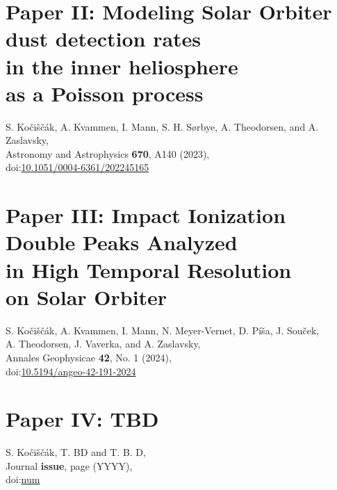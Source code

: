 \documentclass[11pt,twoside,openright]{book}
\begin{document}
\chapter{Paper II: Modeling Solar Orbiter \\ dust detection rates \\ in the inner heliosphere \\ as a Poisson process}
S. Ko{\v{c}}i{\v{s}}{\v{c}}{\'a}k, A. Kvammen, I. Mann, S. H. S{\o}rbye, A. Theodorsen, and A. Zaslavsky,\\
Astronomy and Astrophysics {\bf 670}, A140 (2023),\\
doi:\href{https://doi.org/10.1051/0004-6361/202245165}{10.1051/0004-6361/202245165}
\newpage\null\newpage



\chapter{Paper III: Impact Ionization \\ Double Peaks Analyzed \\ in High Temporal Resolution \\ on Solar Orbiter}
S. Ko{\v{c}}i{\v{s}}{\v{c}}{\'a}k, A. Kvammen, I. Mann, N. Meyer-Vernet, D. P{\'i}{\v{s}}a, J. Sou{\v{c}}ek, \\ A. Theodorsen, J. Vaverka, and A. Zaslavsky,\\
Annales Geophysicae {\bf 42}, No. 1 (2024),\\
doi:\href{https://doi.org/10.5194/angeo-42-191-2024}{10.5194/angeo-42-191-2024}
\newpage\null\newpage



\chapter{Paper IV: TBD}
S. Ko{\v{c}}i{\v{s}}{\v{c}}{\'a}k, T. BD and T. B. D,\\
Journal {\bf issue}, page (YYYY),\\
doi:\href{https://doi.org/num}{num}
\newpage\null\newpage
% 


% 


\end{document}
